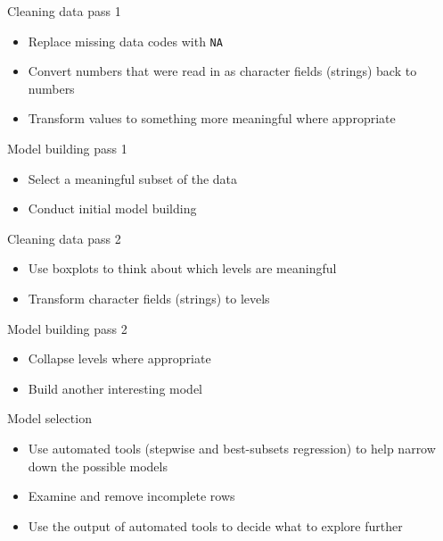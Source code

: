 \documentclass{beamer}\usepackage[]{graphicx}\usepackage[]{color}
\begin{document}
\begin{darkframes}
    \begin{frame}{Cleaning data pass 1}
      \begin{itemize}
        \item Replace missing data codes with \verb|NA|
        \item Convert numbers that were read in as character fields (strings) back to numbers
        \item Transform values to something more meaningful where appropriate
      \end{itemize}
    \end{frame}

    \begin{frame}{Model building pass 1}
      \begin{itemize}
        \item Select a meaningful subset of the data
        \item Conduct initial model building
      \end{itemize}
    \end{frame}

    \begin{frame}{Cleaning data pass 2}
      \begin{itemize}
        \item Use boxplots to think about which levels are meaningful
        \item Transform character fields (strings) to levels
      \end{itemize}
    \end{frame}

    \begin{frame}{Model building pass 2}
      \begin{itemize}
        \item Collapse levels where appropriate
        \item Build another interesting model
      \end{itemize}
    \end{frame}

    \begin{frame}{Model selection}
      \begin{itemize}
        \item Use automated tools (stepwise and best-subsets regression) to help narrow down the possible models
        \item Examine and remove incomplete rows
        \item Use the output of automated tools to decide what to explore further
      \end{itemize}
    \end{frame}
  \end{darkframes}
\end{document}

